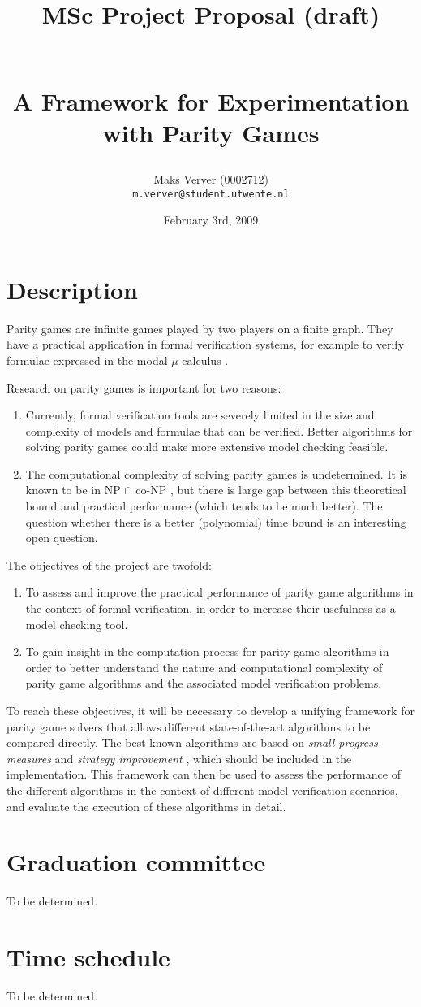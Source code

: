 \documentclass[11pt]{article}
\title{\begin{small}MSc Project Proposal (draft)\end{small}\\
A Framework for Experimentation with Parity Games}
\author{Maks Verver (0002712)\\\texttt{m.verver@student.utwente.nl}}
\date{February 3rd, 2009}
\begin{document}
\maketitle

\section{Description}
Parity games are infinite games played by two players on a finite graph. They
have a practical application in formal verification systems, for example to
verify formulae expressed in the modal $\mu$-calculus \cite{wilke1993}.

Research on parity games is important for two reasons:
\begin{enumerate}
\item Currently, formal verification tools are severely limited in the size and
complexity of models and formulae that can be verified. Better algorithms for
solving parity games could make more extensive model checking feasible.

\item The computational complexity of solving parity games is undetermined. It
is known to be in NP $\cap$ co-NP \cite{emerson2001mcmu}, but there is large gap
between this theoretical bound and practical performance (which tends to be
much better). The question whether there is a better (polynomial) time bound is
an interesting open question.
\end{enumerate}

The objectives of the project are twofold:
\begin{enumerate}
\item To assess and improve the practical performance of parity game algorithms
in the context of formal verification, in order to increase their usefulness as
a model checking tool.
\item To gain insight in the computation process for parity game algorithms in
order to better understand the nature and computational complexity of parity
game algorithms and the associated model verification problems.
\end{enumerate}

To reach these objectives, it will be necessary to develop a unifying framework
for parity game solvers that allows different state-of-the-art algorithms to be
compared directly. The best known algorithms are based on
\emph{small progress measures} \cite{jurdzinski2000spm} and
\emph{strategy improvement} \cite{voge2000dsi} \cite{schewe2008osi}, which
should be included in the implementation.
This framework can then be used to assess the performance of the different algorithms
in the context of different model verification scenarios, and evaluate the
execution of these algorithms in detail.

\section{Graduation committee}
To be determined.

\section{Time schedule}
To be determined.



\end{document}
